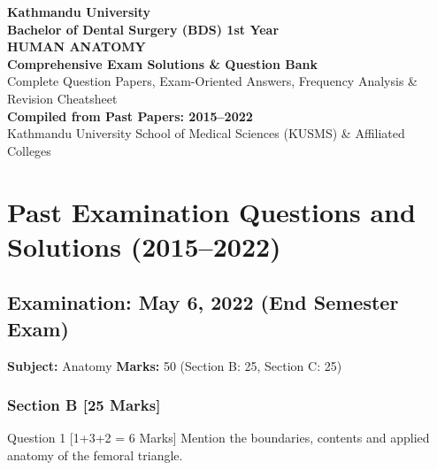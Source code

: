 \documentclass[11pt,a4paper]{article}
\begin{document}
\begin{titlepage}
    \centering
    \vspace*{2cm}
    {\Huge \textbf{Kathmandu University}}\\[0.5cm]
    {\LARGE \textbf{Bachelor of Dental Surgery (BDS) 1st Year}}\\[1.5cm]
    {\Huge \textbf{HUMAN ANATOMY}}\\[0.8cm]
    {\Large \textbf{Comprehensive Exam Solutions \& Question Bank}}\\[0.5cm]
    {\large Complete Question Papers, Exam-Oriented Answers, Frequency Analysis \& Revision Cheatsheet}\\[2cm]
    \vfill
    {\large \textbf{Compiled from Past Papers: 2015--2022}}\\[0.5cm]
    {\small Kathmandu University School of Medical Sciences (KUSMS) \& Affiliated Colleges}
    \vspace*{1.5cm}
\end{titlepage}

\tableofcontents
\newpage

\section{Past Examination Questions and Solutions (2015--2022)}

\subsection{Examination: May 6, 2022 (End Semester Exam)}
\textbf{Subject:} Anatomy \quad \textbf{Marks:} 50 (Section B: 25, Section C: 25)

\subsubsection{Section B [25 Marks]}

\begin{qbox}{Question 1 [1+3+2 = 6 Marks]}
Mention the boundaries, contents and applied anatomy of the femoral triangle.
\end{qbox}
\end{document}

